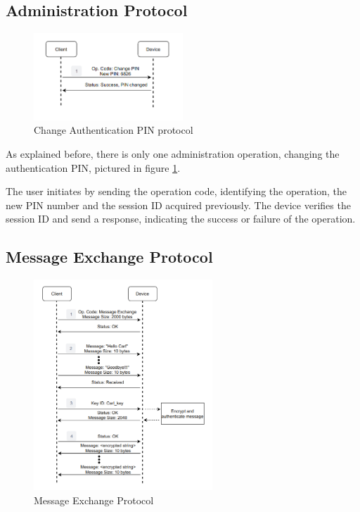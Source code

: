 
\subsection{Administration Protocol} \label{chap:arch:protocol:admin}
\begin{figure}[h]
    \centering
    \includegraphics[width=0.5\textwidth]{./Images/change-PIN.png}
    \caption{Change Authentication PIN protocol}
    \label{fig:protocol:change-PIN}
\end{figure}

As explained before, there is only one administration operation, changing the authentication PIN, pictured in figure \ref{fig:protocol:change-PIN}.

The user initiates by sending the operation code, identifying the operation, the new PIN number and the session ID acquired previously. The device verifies the session ID and send a response, indicating the success or failure of the operation.

\subsection{Message Exchange Protocol} \label{chap:arch:protocol:message}

\begin{figure}[h]
\centering
\includegraphics[width=0.6\textwidth]{./Images/message-exchange.png}
\caption{Message Exchange Protocol}
\label{fig:protocol:message-exchange}
\end{figure}

